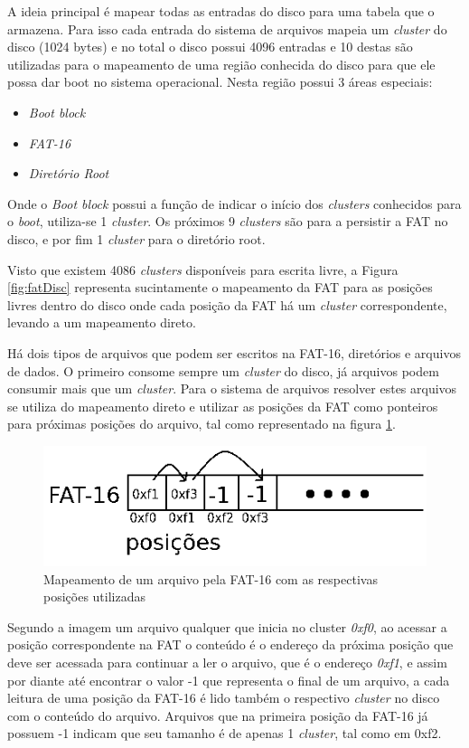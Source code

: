 \documentclass{article}
\begin{document}
	A ideia principal é mapear todas as entradas do disco para uma tabela que o armazena. Para isso cada entrada do sistema de arquivos mapeia um \textit{cluster} do disco (1024 bytes) e no total o disco possui 4096 entradas e 10 destas são utilizadas para o mapeamento de uma região conhecida do disco para que ele possa dar boot no sistema operacional. Nesta região possui 3 áreas especiais:
	\begin{itemize}
	 \item \textit{Boot block}
	 \item \textit{FAT-16}
	 \item \textit{Diretório Root}
	\end{itemize}
	Onde o \textit{Boot block} possui a função de indicar o início dos \textit{clusters} conhecidos para o \textit{boot}, utiliza-se 1 \textit{cluster}. Os próximos 9 \textit{clusters} são para a persistir a FAT no disco, e por fim 1 \textit{cluster} para o diretório root.
	
	Visto que existem 4086 \textit{clusters} disponíveis para escrita livre, a Figura \ref{fig:fatDisc} representa sucintamente o mapeamento da FAT para as posições livres dentro do disco onde cada posição da FAT há um \textit{cluster} correspondente, levando a um mapeamento direto.
	
	Há dois tipos de arquivos que podem ser escritos na FAT-16, diretórios e arquivos de dados. O primeiro consome sempre um \textit{cluster} do disco, já arquivos podem consumir mais que um \textit{cluster}. Para o sistema de arquivos resolver estes arquivos se utiliza do mapeamento direto e utilizar as posições da FAT como ponteiros para próximas posições do arquivo, tal como representado na figura \ref{fig:arqDirDisc}.
	
	\begin{figure}[!h]
		\centering
		\includegraphics[scale=0.5]{mapeamentoArqDir.png}
		\caption{Mapeamento de um arquivo pela FAT-16 com as respectivas posições utilizadas}
		\label{fig:arqDirDisc}
	\end{figure}

	Segundo a imagem um arquivo qualquer que inicia no cluster \textit{0xf0}, ao acessar a posição correspondente na FAT o conteúdo é o endereço da próxima posição que deve ser acessada para continuar a ler o arquivo, que é o endereço \textit{0xf1}, e assim por diante até encontrar o valor -1 que representa o final de um arquivo, a cada leitura de uma posição da FAT-16 é lido também o respectivo \textit{cluster} no disco com o conteúdo do arquivo. Arquivos que na primeira posição da FAT-16 já possuem -1 indicam que seu tamanho é de apenas 1 \textit{cluster}, tal como em 0xf2.
	
\end{document}

